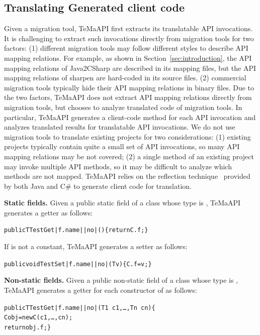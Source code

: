 \subsection{Translating Generated client code}
\label{sec:approach:generating}
Given a migration tool, TeMaAPI first extracts its translatable API invocations. It is challenging to extract such invocations directly from migration tools for two factors: (1) different migration tools may follow different styles to describe API mapping relations. For example, as shown in Section~\ref{sec:introduction}, the API mapping relations of Java2CSharp are described in its mapping files, but the API mapping relations of sharpen are hard-coded in its source files. (2) commercial migration tools typically hide their API mapping relations in binary files. Due to the two factors, TeMaAPI does not extract API mapping relations directly from migration tools, but chooses to analyze translated code of migration tools. In particular, TeMaAPI generates a client-code method for each API invocation and analyzes translated results for translatable API invocations. We do not use migration tools to translate existing projects for two considerations: (1) existing projects typically contain quite a small set of API invocations, so many API mapping relations may be not covered; (2) a single method of an existing project may invoke multiple API methods, so it may be difficult to analyze which methods are not mapped. TeMaAPI relies on the reflection technique~\cite{maes1987concepts} provided by both Java and C\# to generate client code for translation.

\textbf{Static fields.} Given a public static field  of a class  whose type is , TeMaAPI generates a getter as follows:
\begin{CodeOut}%
\begin{alltt}
 public T TestGet|f.name||no|()\{ return C.f; \}
\end{alltt}
\end{CodeOut}

If  is not a constant, TeMaAPI generates a setter as follows:
\begin{CodeOut}%
\begin{alltt}
 public void TestSet|f.name||no|(T v)\{ C.f = v; \}
\end{alltt}
\end{CodeOut}

\textbf{Non-static fields.} Given a public non-static field  of a class  whose type is , TeMaAPI generates a getter for each constructor  of  as follows:
\begin{CodeOut}%
\begin{alltt}
 public T TestGet|f.name||no|(T1\ c1,\ldots, Tn\ cn)\{
    C obj = new C(c1,\ldots, cn);
    return obj.f; \}
\end{alltt}
\end{CodeOut}

